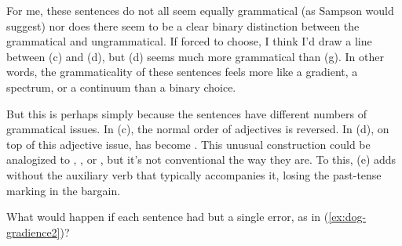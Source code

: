 For me, these sentences do not all seem equally grammatical (as Sampson would suggest) nor does there seem to be a clear binary distinction between the grammatical and ungrammatical. If forced to choose, I think I'd draw a line between (c) and (d), but (d) seems much more grammatical than (g). In other words, the grammaticality of these sentences feels more like a gradient, a spectrum, or a continuum than a binary choice.

But this is perhaps simply because the sentences have different numbers of grammatical issues. In (c), the normal order of adjectives  is reversed. In (d), on top of this adjective issue,  has become . This unusual construction could be analogized to , , or , but it's not conventional the way they are. To this, (e) adds  without the auxiliary verb  that typically accompanies it, losing the past-tense marking in the bargain.

What would happen if each sentence had but a single error, as in (\ref{ex:dog-gradience2})?

\ea \label{ex:dog-gradience2}
 \z
\z




